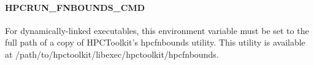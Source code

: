 \paragraph{HPCRUN\_FNBOUNDS\_CMD}

For dynamically-linked executables, this environment variable must
be set to the full path of a copy of HPCToolkit's hpcfnbounds
utility. This utility is available at
/path/to/hpctoolkit/libexec/hpctoolkit/hpcfnbounds.


